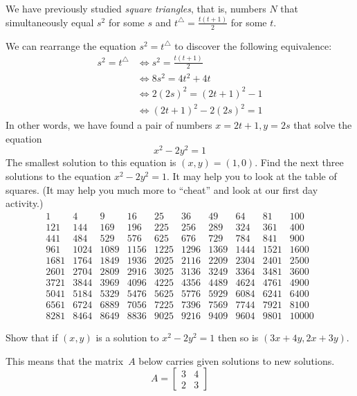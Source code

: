 \documentclass[12pt]{exam}
\begin{document}
\begin{questions}
  \question We have previously studied \emph{square triangles}, that is, numbers $N$ that simultaneously equal $s^2$ for some $s$ and $t^\triangle=\frac{t(t+1)}{2}$ for some $t$.
  
  We can rearrange the equation $s^2=t^\triangle$ to discover the following equivalence:
  \begin{align*}
    s^2=t^\triangle&\iff s^2=\frac{t(t+1)}{2}\\
    &\iff 8s^2=4t^2+4t\\
    &\iff 2(2s)^2=(2t+1)^2-1\\
    &\iff (2t+1)^2-2(2s)^2=1
  \end{align*}
  In other words, we have found a pair of numbers $x=2t+1,y=2s$ that solve the equation
  \[x^2-2y^2=1
  \]
  The smallest solution to this equation is $(x,y)=(1,0)$. Find the next three solutions to the equation $x^2-2y^2=1$. It may help you to look at the table of squares. (It may help you much more to ``cheat'' and look at our first day activity.)
  \[
    \begin{matrix}
      1&4&9&16&25&36&49&64&81&100\\
      121&144&169&196&225&256&289&324&361&400\\
      441&484&529&576&625&676&729&784&841&900\\
      961&1024&1089&1156&1225&1296&1369&1444&1521&1600\\
      1681&1764&1849&1936&2025&2116&2209&2304&2401&2500\\
      2601&2704&2809&2916&3025&3136&3249&3364&3481&3600\\
      3721&3844&3969&4096&4225&4356&4489&4624&4761&4900\\
      5041&5184&5329&5476&5625&5776&5929&6084&6241&6400\\
      6561&6724&6889&7056&7225&7396&7569&7744&7921&8100\\
      8281&8464&8649&8836&9025&9216&9409&9604&9801&10000
    \end{matrix}
  \]
  \newpage
  \question 
  \begin{parts}
    \item Show that if $(x,y)$ is a solution to $x^2-2y^2=1$ then so is $(3x+4y,2x+3y)$.
    \item This means that the matrix $A$ below carries given solutions to new solutions.
    \[A=\begin{bmatrix}3&4\\2&3\end{bmatrix}
\]
\end{parts}
\end{questions}
\end{document}
